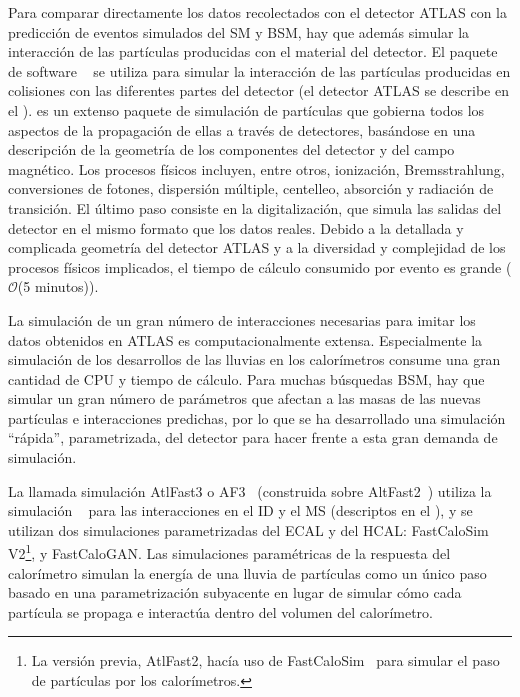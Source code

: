 Para comparar directamente los datos recolectados con el detector \ac{ATLAS} con la predicción de eventos simulados del \ac{SM} y \ac{BSM}, hay que adem\'as simular la interacción de las partículas producidas con el material del detector.
El paquete de software \GEANT~\cite{Geant4} se utiliza para simular la interacción de las partículas producidas en colisiones \pp  con las diferentes partes del detector (el detector \ac{ATLAS} se describe en el \Ch{\ref{ch:atlas}}). \GEANT es un extenso paquete de simulación de partículas que gobierna todos los aspectos de la propagación de ellas a través de detectores, basándose en una descripción de la geometría de los componentes del detector y del campo magnético. Los procesos físicos incluyen, entre otros, ionización, Bremsstrahlung, conversiones de fotones, dispersión múltiple, centelleo, absorción y radiación de transición. El último paso consiste en la digitalización, que simula las salidas del detector en el mismo formato que los datos reales. Debido a la detallada y complicada geometría del detector \ac{ATLAS} y a la diversidad y complejidad de los procesos físicos implicados, el tiempo de cálculo consumido por evento es grande (\(\mathcal{O}\)(5 minutos)).

La simulación de un gran número de interacciones necesarias para imitar los datos obtenidos en \ac{ATLAS} es computacionalmente extensa. Especialmente la simulación de los desarrollos de las lluvias en los calorímetros consume una gran cantidad de CPU y tiempo de cálculo. Para muchas búsquedas \ac{BSM}, hay que simular un gran número de parámetros que afectan a las masas de las nuevas partículas e interacciones predichas, por lo que se ha desarrollado una simulación \enquote{rápida}, parametrizada, del detector para hacer frente a esta gran demanda de simulación.

La llamada simulación AtlFast3 o AF3~\cite{ATLAS-AF3} (construida sobre AltFast2~\cite{ATLAS-AF2}) utiliza la simulación \GEANT~\cite{Geant4} para las interacciones en el \ac{ID} y el \ac{MS} (descriptos en el \Ch{\ref{ch:atlas}}), y se utilizan dos simulaciones parametrizadas del \ac{ECAL} y del \ac{HCAL}: FastCaloSim V2\footnote{La versi\'on previa, AtlFast2, hac\'ia uso de FastCaloSim~\cite{ATLAS-FastCaloSim} para simular el paso de partículas por los calorímetros.}, y FastCaloGAN.
Las simulaciones paramétricas de la respuesta del calorímetro simulan la energía de una lluvia de partículas como un único paso basado en una parametrización subyacente en lugar de simular cómo cada partícula se propaga e interactúa dentro del volumen del calorímetro.

